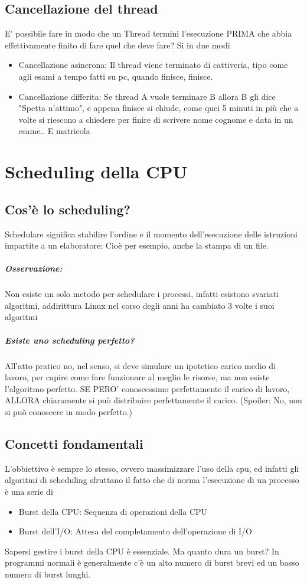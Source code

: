 \documentclass[12pt, a4paper, openany, twoside]{book}
\begin{document}
\section{Cancellazione del thread}
E' possibile fare in modo che un Thread termini l'esecuzione PRIMA che abbia 
effettivamente finito di fare quel che deve fare? Si in due modi
\begin{itemize}
	\item Cancellazione asincrona: Il thread viene terminato di cattiveria, 
	tipo come agli esami a tempo fatti su pc, quando finisce, finisce.
	\item Cancellazione differita: Se thread A vuole terminare B allora B gli
	dice "Spetta n'attimo", e appena finisce si chiude, come quei 5 minuti in 
	più che a volte si riescono a chiedere per finire di scrivere nome cognome
	e data in un esame.. E matricola
\end{itemize}
\chapter{Scheduling della CPU}
\section{Cos'è lo scheduling?}
Schedulare significa stabilire l'ordine e il momento dell'esecuzione delle 
istruzioni impartite a un elaboratore: Cioè per esempio, anche la stampa
di un file.
\paragraph{Osservazione: }Non esiste un solo metodo per schedulare i processi,
infatti esistono svariati algoritmi, addirittura Linux nel corso degli anni
ha cambiato 3 volte i suoi algoritmi
\paragraph{Esiste uno scheduling perfetto? }All'atto pratico no, nel senso, si
deve simulare un ipotetico carico medio di lavoro, per capire come fare 
funzionare al meglio le risorse, ma non esiste l'algoritmo perfetto. SE PERO'
conoscessimo perfettamente il carico di lavoro, ALLORA chiaramente si può
distribuire perfettamente il carico. (Spoiler: No, non si può conoscere 
in modo perfetto.)
\section{Concetti fondamentali}
L'obbiettivo è sempre lo stesso, ovvero massimizzare l'uso della cpu, ed infatti
gli algoritmi di scheduling sfruttano il fatto che di norma l'esecuzione di un 
processo è una serie di \begin{itemize}
\item Burst della CPU: Sequenza di operazioni della CPU
\item Burst dell'I/O: Attesa del completamento dell'operazione di I/O
\end{itemize}
Sapersi gestire i burst della CPU è essenziale. Ma quanto dura un burst?
In programmi normali è generalmente c'è un alto numero di burst brevi ed un 
basso numero di burst lunghi.
\end{document}
